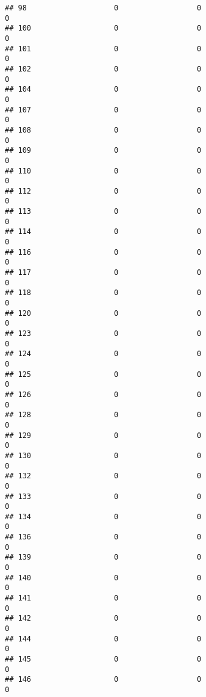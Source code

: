 \documentclass[
]{article}
\begin{document}
\begin{verbatim}
## 98                    0                  0                              0
## 100                   0                  0                              0
## 101                   0                  0                              0
## 102                   0                  0                              0
## 104                   0                  0                              0
## 107                   0                  0                              0
## 108                   0                  0                              0
## 109                   0                  0                              0
## 110                   0                  0                              0
## 112                   0                  0                              0
## 113                   0                  0                              0
## 114                   0                  0                              0
## 116                   0                  0                              0
## 117                   0                  0                              0
## 118                   0                  0                              0
## 120                   0                  0                              0
## 123                   0                  0                              0
## 124                   0                  0                              0
## 125                   0                  0                              0
## 126                   0                  0                              0
## 128                   0                  0                              0
## 129                   0                  0                              0
## 130                   0                  0                              0
## 132                   0                  0                              0
## 133                   0                  0                              0
## 134                   0                  0                              0
## 136                   0                  0                              0
## 139                   0                  0                              0
## 140                   0                  0                              0
## 141                   0                  0                              0
## 142                   0                  0                              0
## 144                   0                  0                              0
## 145                   0                  0                              0
## 146                   0                  0                              0

\end{verbatim}
\end{document}
